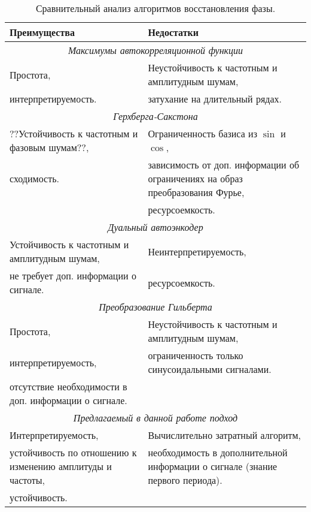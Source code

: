 \documentclass[12pt, twoside]{article}
\theoremstyle{definition}
\begin{document}
\begin{table}
\begin{tabular}{|p{7.5cm}|p{7.5cm}|}
\hline
Преимущества & Недостатки\\
\hline
\multicolumn{2}{|c|}{\textit{Максимумы автокорреляционной функции}}\\
\hline
    Простота, & Неустойчивость к частотным и амплитудным шумам,\\
    интерпретируемость. & затухание на длительный рядах.\\
    
\hline
\multicolumn{2}{|c|}{\textit{Герхберга-Сакстона \cite{gerchberg1972practical}}}\\
\hline
    ??Устойчивость к частотным и фазовым шумам??, & Ограниченность базиса из $\sin$ и $\cos$,\\
    сходимость. & зависимость от доп. информации об ограничениях на образ преобразования Фурье,\\
     & ресурсоемкость.\\
  
\hline
\multicolumn{2}{|c|}{\textit{Дуальный автоэнкодер \cite{jatesiktat2020unsupervised}}}\\
\hline
    Устойчивость к частотным и амплитудным шумам, & Неинтерпретируемость,\\
    не требует доп. информации о сигнале. & ресурсоемкость.\\
\hline
\multicolumn{2}{|c|}{\textit{Преобразование Гильберта \cite{kak1973hilbert}}}\\
\hline
     Простота,&Неустойчивость к частотным и амплитудным шумам,\\
     интерпретируемость, & ограниченность только синусоидальными сигналами.\\
     отсутствие необходимости в доп. информации о сигнале.&\\
\hline
\multicolumn{2}{|c|}{\textit{Предлагаемый в данной работе подход}}\\
\hline
Интерпретируемость, & Вычислительно затратный алгоритм,\\
устойчивость по отношению к изменению амплитуды и частоты,  & необходимость в дополнительной информации о сигнале (знание первого периода).\\
устойчивость.& \\
\hline
\end{tabular}
\caption{\label{tab:table-name}Сравнительный анализ алгоритмов восстановления фазы.}
\end{table}
\end{document}
